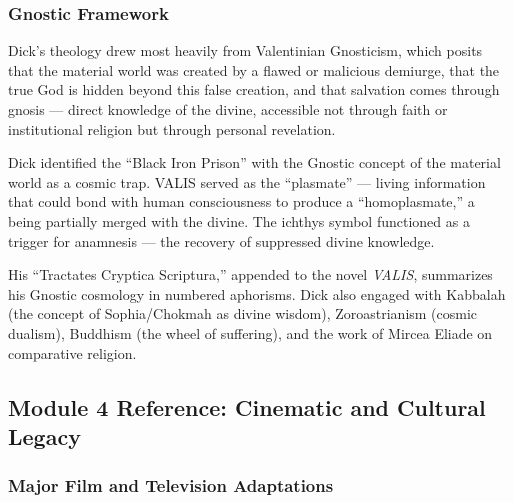 \documentclass[11pt,letterpaper]{article}
\begin{document}
\subsubsection{Gnostic Framework}

Dick's theology drew most heavily from Valentinian Gnosticism, which posits that the material world was created by a flawed or malicious demiurge, that the true God is hidden beyond this false creation, and that salvation comes through gnosis --- direct knowledge of the divine, accessible not through faith or institutional religion but through personal revelation.

Dick identified the ``Black Iron Prison'' with the Gnostic concept of the material world as a cosmic trap. VALIS served as the ``plasmate'' --- living information that could bond with human consciousness to produce a ``homoplasmate,'' a being partially merged with the divine. The ichthys symbol functioned as a trigger for anamnesis --- the recovery of suppressed divine knowledge.

His ``Tractates Cryptica Scriptura,'' appended to the novel \textit{VALIS}, summarizes his Gnostic cosmology in numbered aphorisms. Dick also engaged with Kabbalah (the concept of Sophia/Chokmah as divine wisdom), Zoroastrianism (cosmic dualism), Buddhism (the wheel of suffering), and the work of Mircea Eliade on comparative religion.

\subsection{Module 4 Reference: Cinematic and Cultural Legacy}

\subsubsection{Major Film and Television Adaptations}
\end{document}
